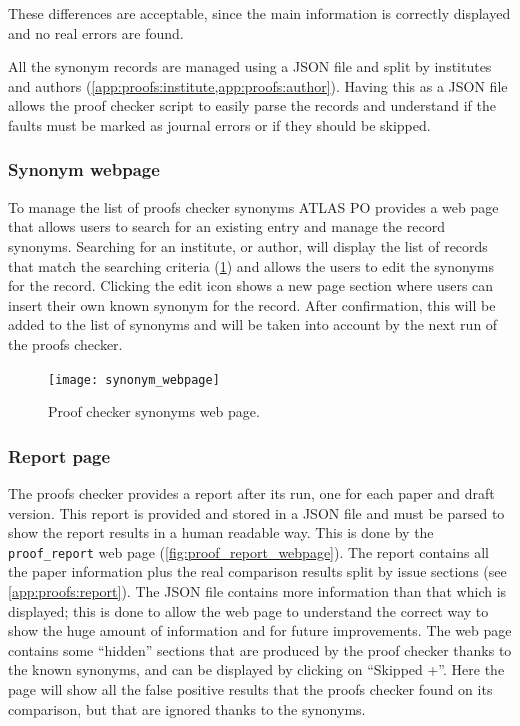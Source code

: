These differences are acceptable, since the main information is correctly displayed and no real errors are found.

All the synonym records are managed using a JSON file and split by institutes and authors (\cref{app:proofs:institute,app:proofs:author}).
Having this as a JSON file allows the proof checker script to easily parse the records and understand if the faults must be marked as journal errors or if they should be skipped.

\subsubsection{Synonym webpage}
\label{sec:Synonym_webpage}

To manage the list of proofs checker synonyms ATLAS PO provides a web page that allows users to search for an existing entry and manage the record synonyms.
Searching for an institute, or author, will display the list of records that match the searching criteria (\cref{fig:synonym_webpage}) and allows the users to edit the synonyms for the record.
Clicking the edit icon shows a new page section where users can insert their own known synonym for the record.
After confirmation, this will be added to the list of synonyms and will be taken into account by the next run of the proofs checker.

\begin{figure}[htb]
  \centering
  \texttt{[image: synonym\_webpage]}
  \caption{Proof checker synonyms web page.}
  \label{fig:synonym_webpage}
\end{figure}

\subsubsection{Report page}
\label{sec:Report_page}

The proofs checker provides a report after its run, one for each paper and draft version.
This report is provided and stored in a JSON file and must be parsed to show the report results in a human readable way.
This is done by the \texttt{proof\_report} web page (\cref{fig:proof_report_webpage}).
The report contains all the paper information plus the real comparison results split by issue sections (see \cref{app:proofs:report}).
The JSON file contains more information than that which is displayed;
this is done to allow the web page to understand the correct way to show the huge amount of information and for future improvements.
The web page contains some \enquote{hidden} sections that are produced by the proof checker thanks to the known synonyms,
and can be displayed by clicking on \enquote{Skipped +}.
Here the page will show all the false positive results that the proofs checker found on its comparison, but that are ignored thanks to the synonyms.

